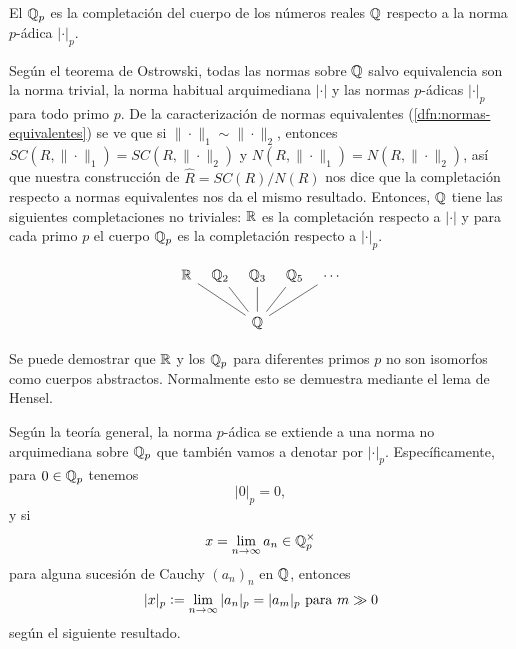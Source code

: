\documentclass{article}
\numberwithin{equation}{section}
\theoremstyle{definition}
\begin{document}
\begin{definicion}
  El  $\mathbb{Q}_p$ es la completación
  del cuerpo de los números reales $\mathbb{Q}$ respecto a la norma $p$-ádica
  $|\cdot|_p$.
\end{definicion}

Según el teorema de Ostrowski, todas las normas sobre $\mathbb{Q}$ salvo equivalencia
son la norma trivial, la norma habitual arquimediana $|\cdot|$ y las normas
$p$-ádicas $|\cdot|_p$ para todo primo $p$. De la caracterización de normas
equivalentes (\ref{dfn:normas-equivalentes}) se ve que
si $\|\cdot\|_1 \sim \|\cdot\|_2$, entonces
$SC (R,\|\cdot\|_1) = SC (R,\|\cdot\|_2)$ y
$N (R,\|\cdot\|_1) = N (R,\|\cdot\|_2)$, así que nuestra construcción
de $\widehat{R} = SC (R)/N(R)$ nos dice que la completación respecto a normas
equivalentes nos da el mismo resultado. Entonces, $\mathbb{Q}$ tiene las siguientes
completaciones no triviales: $\mathbb{R}$ es la completación respecto a $|\cdot|$ y
para cada primo $p$ el cuerpo $\mathbb{Q}_p$ es la completación respecto a $|\cdot|_p$.

\[ \begin{tikzcd}[column sep=0.2cm]
    \RR\ar[-]{drr} & \QQ_2\ar[-]{dr} & \QQ_3\ar[-]{d} & \QQ_5\ar[-]{dl} & \cdots\ar[-]{dll} \\
    & & \QQ
  \end{tikzcd} \]

\begin{comentario}
  Se puede demostrar que $\mathbb{R}$ y los $\mathbb{Q}_p$ para diferentes primos $p$ no
  son isomorfos como cuerpos abstractos. Normalmente esto se demuestra mediante
  el lema de Hensel.
\end{comentario}

Según la teoría general, la norma $p$-ádica se extiende a una norma
no arquimediana sobre $\mathbb{Q}_p$ que también vamos a denotar por
$|\cdot|_p$. Específicamente, para $0\in\mathbb{Q}_p$ tenemos
$$|0|_p = 0,$$
y si
$$x = \lim_{n\to\infty} a_n \in \mathbb{Q}_p^\times$$
para alguna sucesión de Cauchy $(a_n)_n$ en $\mathbb{Q}$, entonces
$$|x|_p \mathrel{\mathop:}= \lim_{n\to\infty} |a_n|_p = |a_m|_p\text{ para }m \gg 0$$
según el siguiente resultado.
\end{document}
